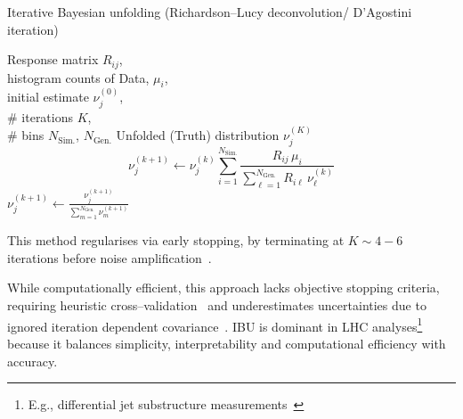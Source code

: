 \begin{algorithm}
\caption{Iterative Bayesian unfolding (Richardson--Lucy deconvolution/ D'Agostini iteration)}
\label{alg:ibu}
\begin{algorithmic}[1]
\algospacing
\Require Response matrix $R_{ij}$,\\
  \hspace*{1em} histogram counts of Data, $\mu_i$,\\
  \hspace*{1em} initial estimate $\nu_j^{(0)}$,\\
  \hspace*{1em} \# iterations $K$,\\
  \hspace*{1em} \# bins $N_{\mathrm{Sim.}}$, $N_{\mathrm{Gen.}}$
\Ensure Unfolded (Truth) distribution $\nu_j^{(K)}$
    \State
    \[
      \nu_j^{(k+1)} \leftarrow
      \nu_j^{(k)} \sum_{i=1}^{N_{\mathrm{Sim.}}}
        \frac{R_{ij}\,\mu_i}
             {\displaystyle \sum_{\ell=1}^{N_{\mathrm{Gen.}}}R_{i\ell}\,\nu_{\ell}^{(k)}}
    \]
  \EndFor
  \State {}
    \State $\displaystyle
      \nu_j^{(k+1)} \leftarrow
      \frac{\nu_j^{(k+1)}}{\sum_{m=1}^{N_{\mathrm{Gen.}}}\nu_{m}^{(k+1)}}
    $
  \EndFor
\EndFor
\State {}
\end{algorithmic}
\end{algorithm}

This method regularises via early stopping, by terminating at \(K \sim 4-6\) iterations before noise amplification~\cite{fish_blind_1995, shepp_maximum_1982}.

While computationally efficient, this approach lacks objective stopping criteria, requiring heuristic cross--validation~\cite{cowan_survey_2002} and underestimates uncertainties due to ignored iteration dependent covariance~\cite{cowan_statistical_1998}.
%
IBU is dominant in LHC analyses\footnote{E.g., differential jet substructure measurements~\cite{atlas_collaboration_measurement_2024}} because it balances simplicity, interpretability and computational efficiency with accuracy.

